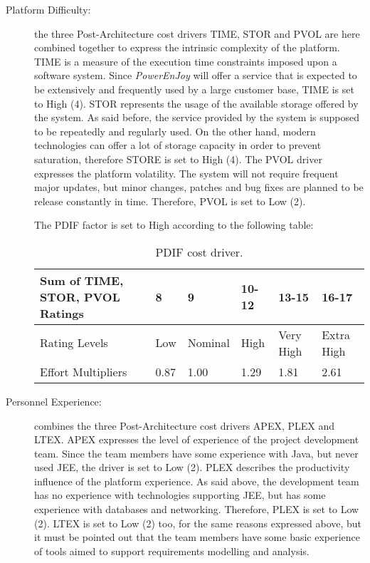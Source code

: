 \begin{description}
\item[Platform Difficulty:] the three Post-Architecture cost drivers TIME, STOR and PVOL are here combined together to express the intrinsic complexity of the platform. TIME is a measure of the execution time constraints imposed upon a software system. Since \emph{PowerEnJoy} will offer a service that is expected to be extensively and frequently used by a large customer base, TIME is set to High (4). STOR represents the usage of the available storage offered by the system. As said before, the service provided by the system is supposed to be repeatedly and regularly used. On the other hand, modern technologies can offer a lot of storage capacity in order to prevent saturation, therefore STORE is set to High (4). The PVOL driver expresses the platform volatility. The system will not require frequent major updates, but minor changes, patches and bug fixes are planned to be release constantly in time. Therefore, PVOL is set to Low (2).

The PDIF factor is set to High according to the following table:

\begin{table}[H]
	\begin{adjustwidth}{-.5in}{-.5in}
    \centering
    \begin{tabular}{p{4cm}|p{1cm}|p{1.5cm}|p{1cm}|p{1cm}|p{1cm}}
        \hline
        Sum of TIME, STOR, PVOL Ratings & 8 & 9 & 10-12 & 13-15 & 16-17 \\
        \hline
        \hline
        Rating Levels & Low & Nominal & High & Very High & Extra High \\
        \hline
        Effort Multipliers & 0.87 & 1.00 & 1.29 & 1.81 & 2.61 \\
        \hline
    \end{tabular}
    \caption{PDIF cost driver.}
    \end{adjustwidth}
\end{table}

\item[Personnel Experience:] combines the three Post-Architecture cost drivers APEX, PLEX and LTEX. APEX expresses the level of experience of the project development team. Since the team members have some experience with Java, but never used JEE, the driver is set to Low (2). PLEX describes the productivity influence of the platform experience. As said above, the development team has no experience with technologies supporting JEE, but has some experience with databases and networking. Therefore, PLEX is set to Low (2). LTEX is set to Low (2) too, for the same reasons expressed above, but it must be pointed out that the team members have some basic experience of tools aimed to support requirements modelling and analysis.


\end{description}
